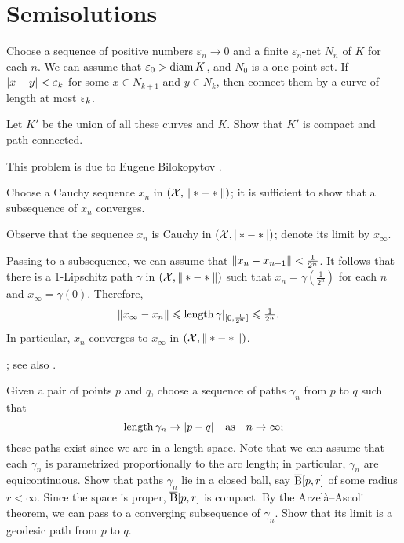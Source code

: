 
\chapter{Semisolutions}

Choose a sequence of positive numbers $\varepsilon_n\to 0$ and a finite $\varepsilon_n$-net $N_n$ of $K$ for each $n$.
We can assume that $\varepsilon_0>\operatorname{\rm diam}\nolimits K$, and $N_0$ is a one-point set.
If $|{x}-{y}|_{}^{{}}<\varepsilon_k$ for some $x\in N_{k+1}$ and $y\in N_{k}$, then connect them by a curve of length at most $\varepsilon_k$.

Let $K'$ be the union of all these curves and $K$.
Show that $K'$ is compact and path-connected.

 This problem is due to Eugene Bilokopytov \cite{bilokopytov}.

Choose a Cauchy sequence $x_n$ in $(\mathcal{X},\|*-*\|)$; it is sufficient to show that a subsequence of $x_n$ converges.

Observe that the sequence $x_n$ is Cauchy in $(\mathcal{X},|*-*|)$;
denote its limit by $x_\infty$.

Passing to a subsequence, we can assume that $\|x_n-x_{n+1}\|<\tfrac1{2^n}$.
It follows that there is a 1-Lipschitz path $\gamma$ in $(\mathcal{X},\|*-*\|)$ such that $x_n=\gamma(\tfrac1{2^n})$ for each $n$ and $x_\infty=\gamma(0)$.
Therefore,
\begin{align*}
\|x_\infty-x_n\|&\leqslant \mathop{\rm length}\nolimits\gamma|_{[0,\frac1{2^n}]}\leqslant \tfrac1{2^n}.
\end{align*}
In particular, $x_n$ converges to $x_\infty$ in $(\mathcal{X},\|*-*\|)$.

 \cite[Corollary]{hu-kirk}; see also \cite[Lemma 2.3]{petrunin-stadler}.

Given a pair of points $p$ and $q$, choose a sequence of paths $\gamma_n$ from $p$ to $q$ such that
\[\mathop{\rm length}\nolimits\gamma_n\to |{p}-{q}|_{}^{{}}
\quad\text{as}\quad
n\to\infty;\]
these paths exist since we are in a length space.
Note that we can assume that each $\gamma_n$ is parametrized proportionally to the arc length;
in particular, $\gamma_n$ are equicontinuous.
Show that paths $\gamma_n$ lie in a closed ball, say $\overline{\mathrm{B}}{}[p,r]$ of some radius $r<\infty$.
Since the space is proper, $\overline{\mathrm{B}}{}[p,r]$ is compact.
By the Arzelà--Ascoli theorem, we can pass to a converging subsequence of $\gamma_n$.
Show that its limit is a geodesic path from $p$ to $q$.

